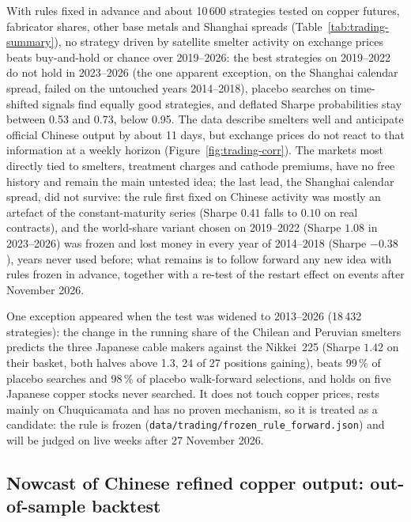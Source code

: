 \documentclass[10pt,a4paper]{article}
\begin{document}
\begin{notebox}
With rules fixed in advance and about 10\,600 strategies tested on copper futures, fabricator shares, other base metals and Shanghai spreads (Table~\ref{tab:trading-summary}), no strategy driven by satellite smelter activity on exchange prices beats buy-and-hold or chance over 2019--2026: the best strategies on 2019--2022 do not hold in 2023--2026 (the one apparent exception, on the Shanghai calendar spread, failed on the untouched years 2014--2018), placebo searches on time-shifted signals find equally good strategies, and deflated Sharpe probabilities stay between 0.53 and 0.73, below 0.95. The data describe smelters well and anticipate official Chinese output by about 11 days, but exchange prices do not react to that information at a weekly horizon (Figure~\ref{fig:trading-corr}). The markets most directly tied to smelters, treatment charges and cathode premiums, have no free history and remain the main untested idea; the last lead, the Shanghai calendar spread, did not survive: the rule first fixed on Chinese activity was mostly an artefact of the constant-maturity series (Sharpe $0.41$ falls to $0.10$ on real contracts), and the world-share variant chosen on 2019--2022 (Sharpe $1.08$ in 2023--2026) was frozen and lost money in every year of 2014--2018 (Sharpe $-0.38$), years never used before; what remains is to follow forward any new idea with rules frozen in advance, together with a re-test of the restart effect on events after November 2026.

One exception appeared when the test was widened to 2013--2026 (18\,432 strategies): the change in the running share of the Chilean and Peruvian smelters predicts the three Japanese cable makers against the Nikkei~225 (Sharpe $1.42$ on their basket, both halves above 1.3, 24 of 27 positions gaining), beats 99\,\% of placebo searches and 98\,\% of placebo walk-forward selections, and holds on five Japanese copper stocks never searched. It does not touch copper prices, rests mainly on Chuquicamata and has no proven mechanism, so it is treated as a candidate: the rule is frozen (\texttt{data/trading/frozen\_rule\_forward.json}) and will be judged on live weeks after 27 November 2026.
\end{notebox}

\subsection{Nowcast of Chinese refined copper output: out-of-sample backtest}\label{sec:nowcast}
\end{document}
